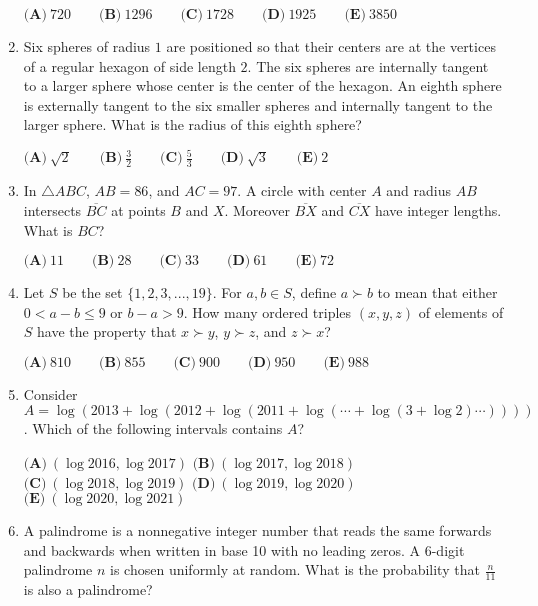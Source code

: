 \documentclass{article}
\begin{document}
\begin{enumerate}[label=\arabic*., itemsep=0.5em]
$ \textbf{(A)} \ 720 \qquad  \textbf{(B)} \ 1296 \qquad  \textbf{(C)} \ 1728 \qquad  \textbf{(D)} \ 1925 \qquad  \textbf{(E)} \ 3850 $\par \vspace{0.5em}\item Six spheres of radius $1$ are positioned so that their centers are at the vertices of a regular hexagon of side length $2$. The six spheres are internally tangent to a larger sphere whose center is the center of the hexagon. An eighth sphere is externally tangent to the six smaller spheres and internally tangent to the larger sphere. What is the radius of this eighth sphere?

$ \textbf{(A)} \ \sqrt{2} \qquad \textbf{(B)} \ \frac{3}{2} \qquad \textbf{(C)} \ \frac{5}{3} \qquad \textbf{(D)} \ \sqrt{3} \qquad \textbf{(E)} \ 2$\par \vspace{0.5em}\item In $ \bigtriangleup ABC $, $ AB = 86 $, and $ AC = 97 $. A circle with center $ A $ and radius $ AB $ intersects $ \overline{BC} $ at points $ B $ and $ X $. Moreover $ \overline{BX} $ and $ \overline{CX} $ have integer lengths. What is $ BC $?

$ \textbf{(A)} \ 11 \qquad  \textbf{(B)} \ 28 \qquad  \textbf{(C)} \ 33 \qquad  \textbf{(D)} \ 61 \qquad  \textbf{(E)} \ 72 $\par \vspace{0.5em}\item Let $S$ be the set $\{1,2,3,...,19\}$. For $a,b \in S$, define $a \succ b$ to mean that either $0 < a - b \le 9$ or $b - a > 9$. How many ordered triples $(x,y,z)$ of elements of $S$ have the property that $x \succ y$, $y \succ z$, and $z \succ x$?

$ \textbf{(A)} \ 810 \qquad  \textbf{(B)} \ 855 \qquad  \textbf{(C)} \ 900 \qquad  \textbf{(D)} \ 950 \qquad  \textbf{(E)} \ 988 $\par \vspace{0.5em}\item Consider $ A = \log (2013 + \log (2012 + \log (2011 + \log (\cdots + \log (3 + \log 2) \cdots )))) $. Which of the following intervals contains $ A $?

$ \textbf{(A)} \ (\log 2016, \log 2017) $
$ \textbf{(B)} \ (\log 2017, \log 2018) $
$ \textbf{(C)} \ (\log 2018, \log 2019) $
$ \textbf{(D)} \ (\log 2019, \log 2020) $
$ \textbf{(E)} \ (\log 2020, \log 2021) $\par \vspace{0.5em}\item A palindrome is a nonnegative integer number that reads the same forwards and backwards when written in base 10 with no leading zeros. A 6-digit palindrome $n$ is chosen uniformly at random. What is the probability that $\frac{n}{11}$ is also a palindrome?


\end{enumerate}
\end{document}
